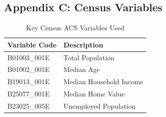 \documentclass[11pt,letterpaper]{article}
\begin{document}
\subsection{Appendix C: Census Variables}
\begin{table}[h]
\centering
\begin{tabular}{ll}
\toprule
\textbf{Variable Code} & \textbf{Description} \\
\midrule
B01003\_001E & Total Population \\
B01002\_001E & Median Age \\
B19013\_001E & Median Household Income \\
B25077\_001E & Median Home Value \\
B23025\_005E & Unemployed Population \\
\bottomrule
\end{tabular}
\caption{Key Census ACS Variables Used}
\end{table}
\end{document}
